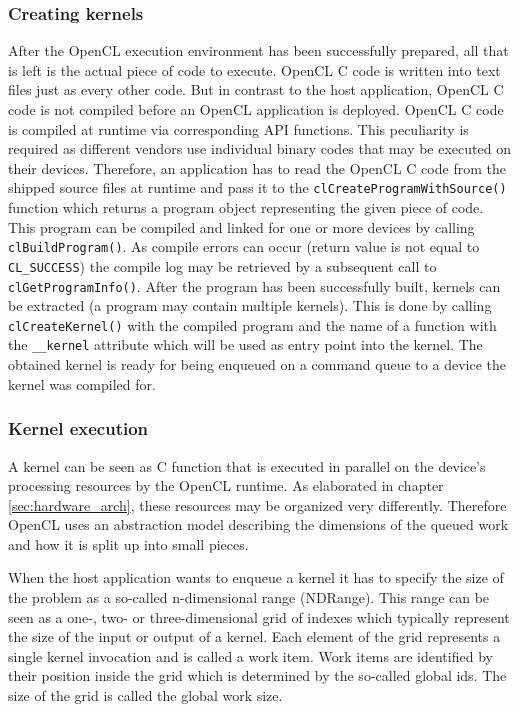 \subsubsection{Creating kernels}
After the OpenCL execution environment has been successfully prepared, all that is left is the actual piece of code to execute. OpenCL C code is written into text files just as every other code. But in contrast to the host application, OpenCL C code is not compiled before an OpenCL application is deployed. OpenCL C code is compiled at runtime via corresponding API functions. This peculiarity is required as different vendors use individual binary codes that may be executed on their devices.
Therefore, an application has to read the OpenCL C code from the shipped source files at runtime and pass it to the \lstinline!clCreateProgramWithSource()! function which returns a program object representing the given piece of code. This program can be compiled and linked for one or more devices by calling \lstinline!clBuildProgram()!. As compile errors can occur (return value is not equal to \lstinline!CL_SUCCESS!) the compile log may be retrieved by a subsequent call to \lstinline!clGetProgramInfo()!. After the program has been successfully built, kernels can be extracted (a program may contain multiple kernels). This is done by calling \lstinline!clCreateKernel()! with the compiled program and the name of a function with the \lstinline!__kernel! attribute which will be used as entry point into the kernel. The obtained kernel is ready for being enqueued on a command queue to a device the kernel was compiled for. \cite[p.26, 27]{opencl_book}

\subsubsection{Kernel execution}
\label{sec:kernel_execcution}
A kernel can be seen as C function that is executed in parallel on the device's processing resources by the OpenCL runtime. As elaborated in chapter \ref{sec:hardware_arch}, these resources may be organized very differently. Therefore OpenCL uses an abstraction model describing the dimensions of the queued work and how it is split up into small pieces. \cite[p.16]{opencl_book}

When the host application wants to enqueue a kernel it has to specify the size of the problem as a so-called n-dimensional range (NDRange). This range can be seen as a one-, two- or three-dimensional grid of indexes which typically represent the size of the input or output of a kernel. Each element of the grid represents a single kernel invocation and is called a work item. Work items are identified by their position inside the grid which is determined by the so-called global ids. The size of the grid is called the global work size. \cite[p.18]{opencl_book}

